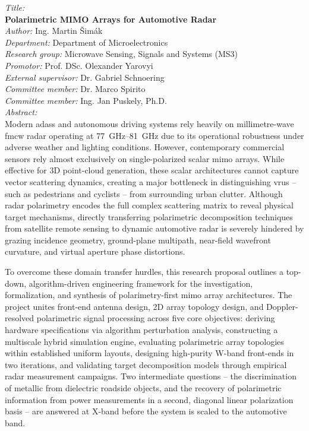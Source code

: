 \clearpage
\noindent\textit{Title:}\\
\textbf{Polarimetric MIMO Arrays for Automotive Radar}\\[0.25cm]
\textit{Author:} Ing. Martin Šimák\\[0.25cm]
\textit{Department:} Department of Microelectronics\\[0.25cm]
\textit{Research group:} Microwave Sensing, Signals and Systems (MS3)\\[0.25cm]
\textit{Promotor:} Prof. DSc. Olexander Yarovyi\\[0.25cm]
\textit{External supervisor:} Dr. Gabriel Schnoering\\[0.25cm]
\textit{Committee member:} Dr. Marco Spirito\\[0.25cm]
\textit{Committee member:} Ing. Jan Puskely, Ph.D.\\[0.25cm]
\textit{Abstract:}\\
Modern \glspl{adas} and autonomous driving systems rely heavily on millimetre-wave \gls{fmcw} radar operating at \qtyrange{77}{81}{\giga\hertz} due to its operational robustness under adverse weather and lighting conditions.
However, contemporary commercial sensors rely almost exclusively on single-polarized scalar \gls{mimo} arrays.
While effective for 3D point-cloud generation, these scalar architectures cannot capture vector scattering dynamics, creating a major bottleneck in distinguishing \glspl{vru} -- such as pedestrians and cyclists -- from surrounding urban clutter.
Although radar polarimetry encodes the full complex scattering matrix to reveal physical target mechanisms, directly transferring polarimetric decomposition techniques from satellite remote sensing to dynamic automotive radar is severely hindered by grazing incidence geometry, ground-plane multipath, near-field wavefront curvature, and virtual aperture phase distortions.

To overcome these domain transfer hurdles, this research proposal outlines a top-down, algorithm-driven engineering framework for the investigation, formalization, and synthesis of polarimetry-first \gls{mimo} array architectures.
The project unites front-end antenna design, 2D array topology design, and Doppler-resolved polarimetric signal processing across five core objectives: deriving hardware specifications via algorithm perturbation analysis, constructing a multiscale hybrid simulation engine, evaluating polarimetric array topologies within established uniform layouts, designing high-purity W-band front-ends in two iterations, and validating target decomposition models through empirical radar measurement campaigns.
Two intermediate questions -- the discrimination of metallic from dielectric roadside objects, and the recovery of polarimetric information from power measurements in a second, diagonal linear polarization basis -- are answered at X-band before the system is scaled to the automotive band.

